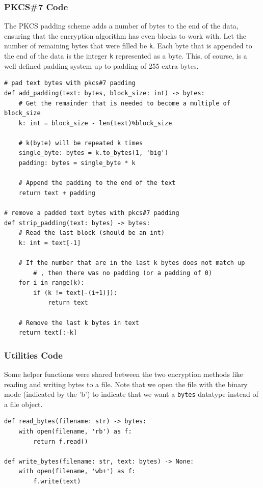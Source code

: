 \documentclass[11pt]{article}
\begin{document}
\subsubsection*{PKCS\#7 Code} 

The PKCS padding scheme adds a number of bytes to the end of the data, ensuring that the encryption algorithm has even blocks to work with. Let the number of remaining bytes that were filled be \verb|k|. Each byte that is appended to the end of the data is the integer \verb|k| represented as a byte. This, of course, is a well defined padding system up to padding of 255 extra bytes.

\begin{framed}
\begin{verbatim}
# pad text bytes with pkcs#7 padding
def add_padding(text: bytes, block_size: int) -> bytes:
    # Get the remainder that is needed to become a multiple of block_size
    k: int = block_size - len(text)%block_size

    # k(byte) will be repeated k times
    single_byte: bytes = k.to_bytes(1, 'big')
    padding: bytes = single_byte * k

    # Append the padding to the end of the text 
    return text + padding 

# remove a padded text bytes with pkcs#7 padding
def strip_padding(text: bytes) -> bytes:
    # Read the last block (should be an int)
    k: int = text[-1]

    # If the number that are in the last k bytes does not match up
		# , then there was no padding (or a padding of 0)
    for i in range(k):
        if (k != text[-(i+1)]):
            return text 

    # Remove the last k bytes in text 
    return text[:-k]
\end{verbatim}
\end{framed}

\subsubsection*{Utilities Code}

Some helper functions were shared between the two encryption methods like reading and writing bytes to a file. Note that we open the file with the binary mode (indicated by the 'b') to indicate that we want a \verb|bytes| datatype instead of a file object.

\begin{framed}
\begin{verbatim}
def read_bytes(filename: str) -> bytes:
    with open(filename, 'rb') as f:
        return f.read()

def write_bytes(filename: str, text: bytes) -> None:
    with open(filename, 'wb+') as f:
        f.write(text)
\end{verbatim}
\end{framed}
\end{document}
